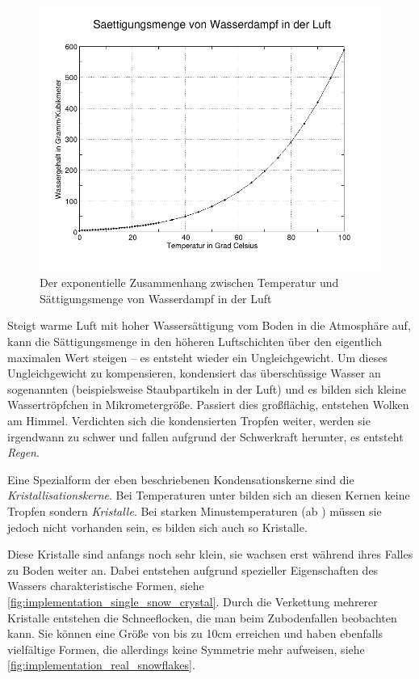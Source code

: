 \begin{figure}[ht]
\centering
\includegraphics[width=15cm]{images/moist_air}
\caption{Der exponentielle Zusammenhang zwischen Temperatur und Sättigungsmenge von Wasserdampf in der Luft\cite{wiki:Saettigung}}
\label{fig:implementation_moist_air}
\end{figure}

Steigt warme Luft mit hoher Wassersättigung vom Boden in die
Atmosphäre auf, kann die Sättigungsmenge in den höheren Luftschichten
über den eigentlich maximalen Wert steigen -- es entsteht wieder ein
Ungleichgewicht. Um dieses Ungleichgewicht zu kompensieren, kondensiert
das überschüssige Wasser an sogenannten
 (beispielsweise Staubpartikeln in
der Luft) und es bilden sich kleine Wassertröpfchen in
Mikrometergröße. Passiert dies großflächig, entstehen Wolken am
Himmel. Verdichten sich die kondensierten Tropfen weiter, werden sie
irgendwann zu schwer und fallen aufgrund der Schwerkraft herunter, es
entsteht \emph{Regen}.

Eine Spezialform der eben beschriebenen Kondensationskerne sind die
\emph{Kristallisationskerne}. Bei Temperaturen unter 
bilden sich an diesen Kernen keine Tropfen sondern \emph{Kristalle}.
Bei starken Minustemperaturen (ab ) müssen sie
jedoch nicht vorhanden sein, es bilden sich auch so Kristalle.

Diese Kristalle sind anfangs noch sehr klein, sie wachsen erst während ihres
Falles zu Boden weiter an. Dabei entstehen aufgrund spezieller
Eigenschaften des Wassers charakteristische Formen, siehe
\autoref{fig:implementation_single_snow_crystal}. Durch die Verkettung
mehrerer Kristalle entstehen die Schneeflocken, die man beim
Zubodenfallen beobachten kann. Sie können eine Größe von bis zu 10cm
erreichen\cite{Nau96} und haben ebenfalls vielfältige Formen, die
allerdings keine Symmetrie mehr aufweisen, siehe
\autoref{fig:implementation_real_snowflakes}.

